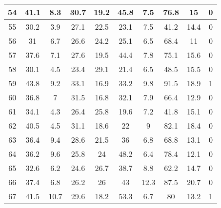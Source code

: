 \begin{longtable} {|c|c|c|c|c|c|c|c|c|c|}
54                            &        41.1&         8.3&        30.7&        19.2&        45.8&         7.5&        76.8&          15&           0\\\hline
55                            &        30.2&         3.9&        27.1&        22.5&        23.1&         7.5&        41.2&        14.4&           0\\\hline
56                            &          31&         6.7&        26.6&        24.2&        25.1&         6.5&        68.4&          11&           0\\\hline
57                            &        37.6&         7.1&        27.6&        19.5&        44.4&         7.8&        75.1&        15.6&           0\\\hline
58                            &        30.1&         4.5&        23.4&        29.1&        21.4&         6.5&        48.5&        15.5&           0\\\hline
59                            &        43.8&         9.2&        33.1&        16.9&        33.2&         9.8&        91.5&        18.9&           1\\\hline
60                            &        36.8&           7&        31.5&        16.8&        32.1&         7.9&        66.4&        12.9&           0\\\hline
61                            &        34.1&         4.3&        26.4&        25.8&        19.6&         7.2&        41.8&        15.1&           0\\\hline
62                            &        40.5&         4.5&        31.1&        18.6&          22&           9&        82.1&        18.4&           0\\\hline
63                            &        36.4&         9.4&        28.6&        21.5&          36&         6.8&        68.8&        13.1&           0\\\hline
64                            &        36.2&         9.6&        25.8&          24&        48.2&         6.4&        78.4&        12.1&           0\\\hline
65                            &        32.6&         6.2&        24.6&        26.7&        38.7&         8.8&        62.2&        14.7&           0\\\hline
66                            &        37.4&         6.8&        26.2&          26&          43&        12.3&        87.5&        20.7&           0\\\hline
67                            &        41.5&        10.7&        29.6&        18.2&        53.3&         6.7&          80&        13.2&           1\\\hline

\end{longtable}
